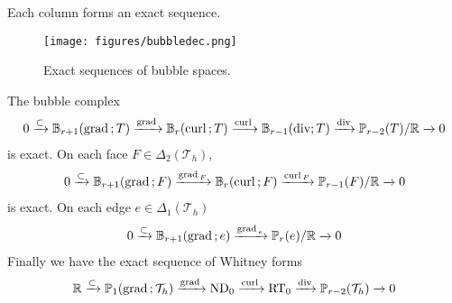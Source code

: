 \documentclass[10pt]{amsart}
\newcommand{\Oplus}{\ensuremath{\vcenter{\hbox{\scalebox{1.5}{$\oplus$}}}}}
\begin{document}
Each column forms an exact sequence.
\begin{figure}[htbp]
\begin{center}
\texttt{[image: figures/bubbledec.png]}
\caption{Exact sequences of bubble spaces.}
\label{default}
\end{center}
\end{figure}



\begin{lemma}
The bubble complex
\begin{align*}
0\xrightarrow{\subset} \mathbb B_{r+1}({\rm grad\,}; T)\xrightarrow{{\rm grad\,}}\mathbb B_r({\rm curl\,}; T)\xrightarrow{{\rm curl\,}} \mathbb B_{r-1}(\operatorname{div}; T) \xrightarrow{\operatorname{div}} \mathbb P_{r-2}(T)/\mathbb R\xrightarrow{}0
\end{align*}
is exact. On each face $F\in \Delta_2(\mathcal T_h)$, 
\begin{align*}
0\xrightarrow{\subset} \mathbb B_{r+1}({\rm grad\,}; F)\xrightarrow{{\rm grad\,}_F}\mathbb B_r({\rm curl\,}; F)\xrightarrow{{\rm curl\,}_F} \mathbb P_{r-1}(F)/\mathbb R\xrightarrow{}0
\end{align*}
is exact. On each edge $e\in \Delta_1(\mathcal T_h)$
\begin{align*}
0\xrightarrow{\subset} \mathbb B_{r+1}({\rm grad\,}; e)\xrightarrow{{\rm grad\,}_e} \mathbb P_{r}(e)/\mathbb R\xrightarrow{}0
\end{align*}
Finally we have the exact sequence of Whitney forms
\begin{align*}
\mathbb R\xrightarrow{\subset} \mathbb P_1({\rm grad\,}; \mathcal T_h)\xrightarrow{{\rm grad\,}} {\rm ND}_0\xrightarrow{{\rm curl\,}}{\rm RT}_0\xrightarrow{\operatorname{div}} \mathbb P_{r-2} (\mathcal T_h)\xrightarrow{}0
\end{align*}
\end{lemma}
\end{document}
